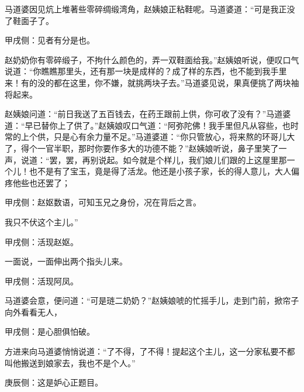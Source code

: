 \begin{parag}
    马道婆因见炕上堆著些零碎绸缎湾角，赵姨娘正粘鞋呢。马道婆道：“可是我正没了鞋面子了。\begin{note}甲戌侧：见者有分是也。\end{note}赵奶奶你有零碎缎子，不拘什么颜色的，弄一双鞋面给我。”赵姨娘听说，便叹口气说道：“你瞧瞧那里头，还有那一块是成样的？成了样的东西，也不能到我手里来！有的没的都在这里，你不嫌，就挑两块子去。”马道婆见说，果真便挑了两块袖将起来。
\end{parag}


\begin{parag}
    赵姨娘问道：“前日我送了五百钱去，在药王跟前上供，你可收了没有？”马道婆道：“早已替你上了供了。”赵姨娘叹口气道：“阿弥陀佛！我手里但凡从容些，也时常的上个供，只是心有余力量不足。”马道婆道：“你只管放心，将来熬的环哥儿大了，得个一官半职，那时你要作多大的功德不能？”赵姨娘听说，鼻子里笑了一声，说道：“罢，罢，再别说起。如今就是个样儿，我们娘儿们跟的上这屋里那一个儿！也不是有了宝玉，竟是得了活龙。他还是小孩子家，长的得人意儿，大人偏疼他些也还罢了；\begin{note}甲戌侧：赵妪数语，可知玉兄之身份，况在背后之言。\end{note}我只不伏这个主儿。”\begin{note}甲戌侧：活现赵妪。\end{note}一面说，一面伸出两个指头儿来。\begin{note}甲戌侧：活现阿凤。\end{note}马道婆会意，便问道：“可是琏二奶奶？”赵姨娘唬的忙摇手儿，走到门前，掀帘子向外看看无人，\begin{note}甲戌侧：是心胆俱怕破。\end{note}方进来向马道婆悄悄说道：“了不得，了不得！提起这个主儿，这一分家私要不都叫他搬送到娘家去，我也不是个人。”\begin{note}庚辰侧：这是妒心正题目。\end{note}
\end{parag}


